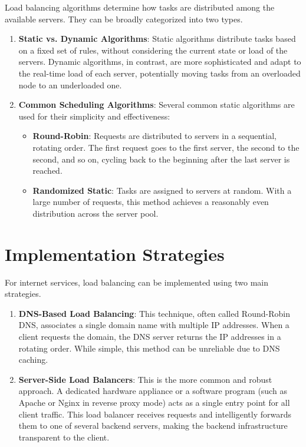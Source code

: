 \documentclass{scrbook}
\begin{document}
	Load balancing algorithms determine how tasks are distributed among the available servers. They can be broadly categorized into two types.
	
	\begin{enumerate}
	    \item \textbf{Static vs. Dynamic Algorithms}: Static algorithms distribute tasks based on a fixed set of rules, without considering the current state or load of the servers. Dynamic algorithms, in contrast, are more sophisticated and adapt to the real-time load of each server, potentially moving tasks from an overloaded node to an underloaded one.
	    \item \textbf{Common Scheduling Algorithms}: Several common static algorithms are used for their simplicity and effectiveness:
	    \begin{itemize}
	        \item \textbf{Round-Robin}: Requests are distributed to servers in a sequential, rotating order. The first request goes to the first server, the second to the second, and so on, cycling back to the beginning after the last server is reached.
	        \item \textbf{Randomized Static}: Tasks are assigned to servers at random. With a large number of requests, this method achieves a reasonably even distribution across the server pool.
	    \end{itemize}
	\end{enumerate}
	
	\section{Implementation Strategies}
	
	For internet services, load balancing can be implemented using two main strategies.
	
	\begin{enumerate}
	    \item \textbf{DNS-Based Load Balancing}: This technique, often called Round-Robin DNS, associates a single domain name with multiple IP addresses. When a client requests the domain, the DNS server returns the IP addresses in a rotating order. While simple, this method can be unreliable due to DNS caching.
	    \item \textbf{Server-Side Load Balancers}: This is the more common and robust approach. A dedicated hardware appliance or a software program (such as Apache or Nginx in reverse proxy mode) acts as a single entry point for all client traffic. This load balancer receives requests and intelligently forwards them to one of several backend servers, making the backend infrastructure transparent to the client.
	\end{enumerate}
	
\end{document}
